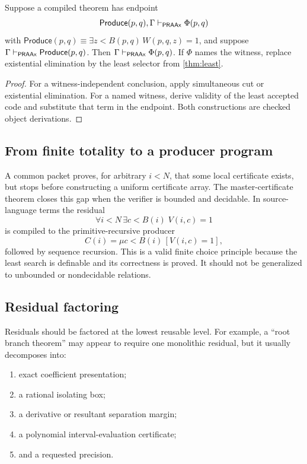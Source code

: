 \begin{proposition}
Suppose a compiled theorem has endpoint
\[
 \mathsf{Produce}(p,q),\Gamma\vdash_{\mathsf{PRAAx}}\Phi(p,q)
\]
with
\(\mathsf{Produce}(p,q)\equiv\exists z<B(p,q)\,W(p,q,z)=1\), and suppose
\(\Gamma\vdash_{\mathsf{PRAAx}}\mathsf{Produce}(p,q)\).  Then
\(\Gamma\vdash_{\mathsf{PRAAx}}\Phi(p,q)\).  If \(\Phi\) names the witness, replace
existential elimination by the least selector from \cref{thm:least}.
\end{proposition}

\begin{proof}
For a witness-independent conclusion, apply simultaneous cut or existential
elimination.  For a named witness, derive validity of the least accepted code
and substitute that term in the endpoint.  Both constructions are checked
object derivations.
\end{proof}

\subsection{From finite totality to a producer program}

A common packet proves, for arbitrary \(i<N\), that some local certificate
exists, but stops before constructing a uniform certificate array.  The
master-certificate theorem closes this gap when the verifier is bounded and
decidable.  In source-language terms the residual
\[
   \forall i<N\,\exists c<B(i)\;V(i,c)=1
\]
is compiled to the primitive-recursive producer
\[
   C(i)=\mu c<B(i)\,[V(i,c)=1],
\]
followed by sequence recursion.  This is a valid finite choice principle
because the least search is definable and its correctness is proved.  It
should not be generalized to unbounded or nondecidable relations.

\subsection{Residual factoring}

Residuals should be factored at the lowest reusable level.  For example, a
``root branch theorem'' may appear to require one monolithic residual, but it
usually decomposes into:

\begin{enumerate}
\item exact coefficient presentation;
\item a rational isolating box;
\item a derivative or resultant separation margin;
\item a polynomial interval-evaluation certificate;
\item and a requested precision.
\end{enumerate}

